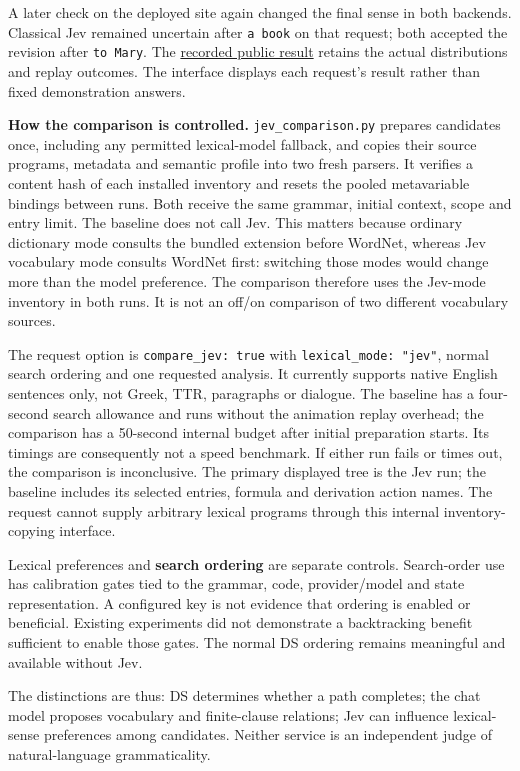 \documentclass[11pt,a4paper]{article}
\begin{document}
A later check on the deployed site again changed the final sense in both
backends. Classical Jev remained uncertain after \texttt{a\ book} on
that request; both accepted the revision after \texttt{to\ Mary}. The
\href{../data/lexical-revision/jev-comparison-live-2026-10-04.json}{recorded
public result} retains the actual distributions and replay outcomes. The
interface displays each request's result rather than fixed demonstration
answers.

\textbf{How the comparison is controlled.} \nolinkurl{jev_comparison.py}
prepares candidates once, including any permitted lexical-model
fallback, and copies their source programs, metadata and semantic
profile into two fresh parsers. It verifies a content hash of each
installed inventory and resets the pooled metavariable bindings between
runs. Both receive the same grammar, initial context, scope and entry
limit. The baseline does not call Jev. This matters because ordinary
dictionary mode consults the bundled extension before WordNet, whereas
Jev vocabulary mode consults WordNet first: switching those modes would
change more than the model preference. The comparison therefore uses the
Jev-mode inventory in both runs. It is not an off/on comparison of two
different vocabulary sources.

The request option is \texttt{compare\_jev:\ true} with
\texttt{lexical\_mode:\ "jev"}, normal search ordering and one requested
analysis. It currently supports native English sentences only, not
Greek, TTR, paragraphs or dialogue. The baseline has a four-second
search allowance and runs without the animation replay overhead; the
comparison has a 50-second internal budget after initial preparation
starts. Its timings are consequently not a speed benchmark. If either
run fails or times out, the comparison is inconclusive. The primary
displayed tree is the Jev run; the baseline includes its selected
entries, formula and derivation action names. The request cannot supply
arbitrary lexical programs through this internal inventory-copying
interface.

Lexical preferences and \textbf{search ordering} are separate controls.
Search-order use has calibration gates tied to the grammar, code,
provider/model and state representation. A configured key is not
evidence that ordering is enabled or beneficial. Existing experiments
did not demonstrate a backtracking benefit sufficient to enable those
gates. The normal DS ordering remains meaningful and available without
Jev.

The distinctions are thus: DS determines whether a path completes; the
chat model proposes vocabulary and finite-clause relations; Jev can
influence lexical-sense preferences among candidates. Neither service is
an independent judge of natural-language grammaticality.
\end{document}
